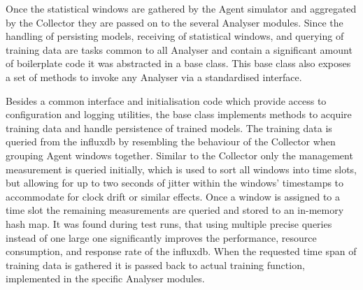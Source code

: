\begin{comment}
\begin{itemize}
	\item non functional base class, unifying commonly used functions for analyser modules, including
		\subitem logging and config setup
		\subitem model persistence (loading and saving)
		\subitem acquiring training data from \gls{influxdb}
		\subitem common entrypoint functions for training and analyse modes
	\item training data is generated by first querying the \code{agent\_status} metric for the requested training period
	\item this metric is used to group the different agents by time slots, similar to what the collector (cf. Section~\ref{sec:impl:collector}) is doing
		\subitem fuzzy, allowing for up to 2 seconds between the capture timestamps of the different windows
		\subitem accommodate for clock drift of the agents and delays, jitter, etc of the transport
	\item once the grouping is finished the remaining metrics are queried for all windows in a time slots
	\item reduced RAM overhead during the querying and enables better (fuzzy) grouping, mitigating shortcoming in the \gls{influxdb} query language
\end{itemize}
\end{comment}

Once the statistical windows are gathered by the Agent simulator and aggregated by the Collector they are passed on to the several Analyser modules.
Since the handling of persisting models, receiving of statistical windows, and querying of training data are tasks common to all Analyser and contain a significant amount of boilerplate code it was abstracted in a base class.
This base class also exposes a set of methods to invoke any Analyser via a standardised interface.

Besides a common interface and initialisation code which provide access to configuration and logging utilities, the base class implements methods to acquire training data and handle persistence of trained models.
The training data is queried from the \gls{influxdb} by resembling the behaviour of the Collector when grouping Agent windows together.
Similar to the Collector only the management measurement is queried initially, which is used to sort all windows into time slots, but allowing for up to two seconds of jitter within the windows' timestamps to accommodate for clock drift or similar effects.
Once a window is assigned to a time slot the remaining measurements are queried and stored to an in-memory hash map. It was found during test runs, that using multiple precise queries instead of one large one significantly improves the performance, resource consumption, and response rate of the \gls{influxdb}.
When the requested time span of training data is gathered it is passed back to actual training function, implemented in the specific Analyser modules.

